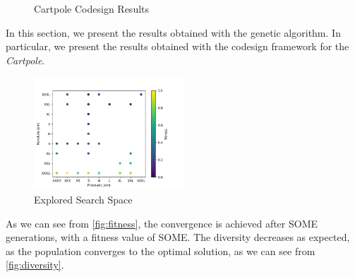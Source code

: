 \begin{figure}[h]
    \centering
    \caption{Cartpole Codesign Results}
\end{figure}

In this section, we present the results obtained with the genetic algorithm. In particular, we present the results obtained with the codesign
framework for the \textit{Cartpole}.

\begin{figure}
    \centering
    \caption{Explored Search Space}
    \label{fig:searchspace}
    \includegraphics[width=0.5\textwidth]{Images/search_space.png}
\end{figure}

As we can see from \cref{fig:fitness}, the convergence is achieved after SOME generations, with a fitness value of SOME. The diversity decreases as expected, as the population converges to the optimal solution, as we can see from \cref{fig:diversity}.